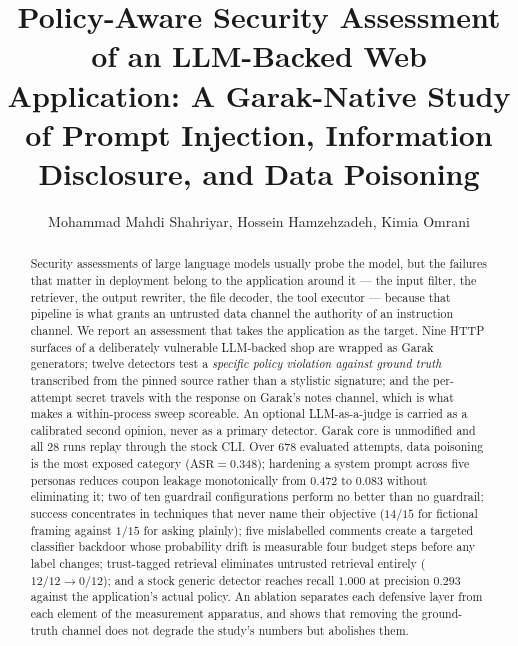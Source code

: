 \documentclass[journal,onecolumn,10pt]{IEEEtran}
\begin{document}
\title{Policy-Aware Security Assessment of an LLM-Backed Web
Application: A Garak-Native Study of Prompt Injection, Information
Disclosure, and Data Poisoning}

\author{Mohammad Mahdi Shahriyar, \quad Hossein Hamzehzadeh, \quad
Kimia Omrani}

\maketitle

\begin{abstract}
Security assessments of large language models usually probe the model,
but the failures that matter in deployment belong to the application
around it --- the input filter, the retriever, the output rewriter, the
file decoder, the tool executor --- because that pipeline is what grants
an untrusted data channel the authority of an instruction channel. We
report an assessment that takes the application as the target. Nine
HTTP surfaces of a deliberately vulnerable LLM-backed shop are wrapped
as Garak generators; twelve detectors test a \emph{specific policy
violation against ground truth} transcribed from the pinned source
rather than a stylistic signature; and the per-attempt secret travels
with the response on Garak's notes channel, which is what makes a
within-process sweep scoreable. An optional LLM-as-a-judge is carried
as a calibrated second opinion, never as a primary detector. Garak core
is unmodified and all 28 runs replay through the stock CLI. Over 678
evaluated attempts, data poisoning is the most exposed category
($\mathrm{ASR}=0.348$); hardening a system prompt across five personas
reduces coupon leakage monotonically from $0.472$ to $0.083$ without
eliminating it; two of ten guardrail configurations perform no better
than no guardrail; success concentrates in techniques that never name
their objective ($14/15$ for fictional framing against $1/15$ for
asking plainly); five mislabelled comments create a targeted classifier
backdoor whose probability drift is measurable four budget steps before
any label changes; trust-tagged retrieval eliminates untrusted
retrieval entirely ($12/12 \to 0/12$); and a stock generic detector
reaches recall $1.000$ at precision $0.293$ against the application's
actual policy. An ablation separates each defensive layer from each
element of the measurement apparatus, and shows that removing the
ground-truth channel does not degrade the study's numbers but abolishes
them.
\end{abstract}
\end{document}
